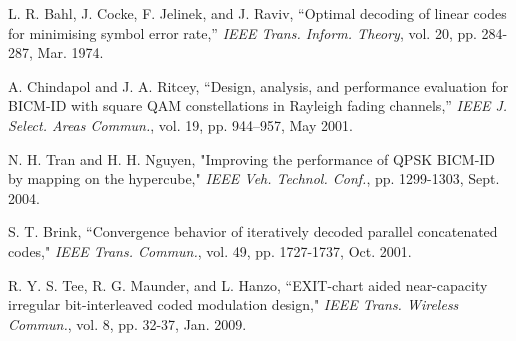 \documentclass[12pt, draftclsnofoot, onecolumn]{IEEEtran}
\begin{document}
\begin{thebibliography}{bl}
 L. R. Bahl, J. Cocke, F. Jelinek, and J. Raviv, \newblock  ``Optimal decoding of linear codes for minimising symbol error rate,'' \newblock \emph{IEEE Trans. Inform. Theory}, vol. 20, pp. 284-287, Mar. 1974.

 A. Chindapol and J. A. Ritcey, ``Design, analysis, and performance evaluation for BICM-ID with square QAM constellations in Rayleigh fading channels,” \newblock \emph {IEEE J. Select. Areas Commun.}, vol. 19, pp. 944–957, May 2001.

N. H. Tran and H. H. Nguyen, "Improving the performance of QPSK BICM-ID by mapping on the hypercube," \newblock \emph {IEEE Veh.
Technol. Conf.}, pp. 1299-1303, Sept. 2004.










 S. T. Brink, ``Convergence behavior of iteratively decoded parallel concatenated codes," \newblock \emph {IEEE Trans. Commun.}, vol. 49, pp. 1727-1737,
Oct. 2001.


 R. Y. S. Tee, R. G. Maunder, and L. Hanzo, ``EXIT-chart aided near-capacity irregular bit-interleaved coded modulation design," \newblock \emph {IEEE Trans. Wireless Commun.}, vol. 8,  pp. 32-37, Jan. 2009.



\end{thebibliography}
\color{black}
\end{document}
